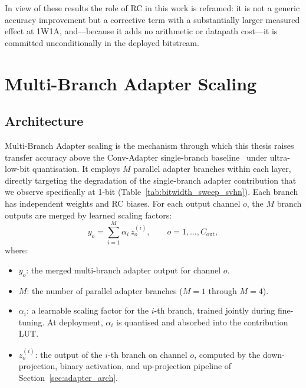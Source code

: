 \documentclass[12pt, a4paper]{report}
\numberwithin{equation}{chapter}
\numberwithin{figure}{chapter}
\numberwithin{table}{chapter}
\numberwithin{algorithm}{chapter}
\begin{document}
In view of these results the role of RC in this work is reframed: it is not a generic accuracy improvement but a corrective term with a substantially larger measured effect at 1W1A, and---because it adds no arithmetic or datapath cost---it is committed unconditionally in the deployed bitstream.

\section{Multi-Branch Adapter Scaling}
\label{sec:multi_adapter}

\subsection{Architecture}

Multi-Branch Adapter scaling is the mechanism through which this thesis raises transfer accuracy above the Conv-Adapter single-branch baseline~\cite{Chen2024ConvAdapter} under ultra-low-bit quantisation. It employs $M$ parallel adapter branches within each layer, directly targeting the degradation of the single-branch adapter contribution that we observe specifically at 1-bit (Table~\ref{tab:bitwidth_sweep_svhn}). Each branch has independent weights and RC biases. For each output channel $o$, the $M$ branch outputs are merged by learned scaling factors:
\begin{equation}
y_o = \sum_{i=1}^{M} \alpha_i\, z_o^{(i)}, \qquad o = 1, \ldots, C_{\text{out}},
\label{eq:multi_adapter}
\end{equation}
where:
\begin{itemize}
    \item $y_o$: the merged multi-branch adapter output for channel $o$.
    \item $M$: the number of parallel adapter branches ($M{=}1$ through $M{=}4$).
    \item $\alpha_i$: a learnable scaling factor for the $i$-th branch, trained jointly during fine-tuning. At deployment, $\alpha_i$ is quantised and absorbed into the contribution LUT.
    \item $z_o^{(i)}$: the output of the $i$-th branch on channel $o$, computed by the down-projection, binary activation, and up-projection pipeline of Section~\ref{sec:adapter_arch}.
\end{itemize}
\end{document}
